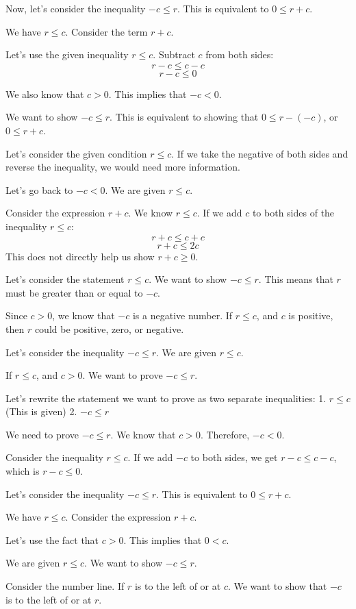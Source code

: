 \documentclass{article}
\begin{document}
Now, let's consider the inequality $-c \le r$.
This is equivalent to $0 \le r + c$.

We have $r \le c$.
Consider the term $r+c$.

Let's use the given inequality $r \le c$.
Subtract $c$ from both sides:
$$ r - c \le c - c $$
$$ r - c \le 0 $$

We also know that $c > 0$. This implies that $-c < 0$.

We want to show $-c \le r$.
This is equivalent to showing that $0 \le r - (-c)$, or $0 \le r + c$.

Let's consider the given condition $r \le c$.
If we take the negative of both sides and reverse the inequality, we would need more information.

Let's go back to $-c < 0$.
We are given $r \le c$.

Consider the expression $r+c$.
We know $r \le c$.
If we add $c$ to both sides of the inequality $r \le c$:
$$ r + c \le c + c $$
$$ r + c \le 2c $$
This does not directly help us show $r+c \ge 0$.

Let's consider the statement $r \le c$.
We want to show $-c \le r$.
This means that $r$ must be greater than or equal to $-c$.

Since $c > 0$, we know that $-c$ is a negative number.
If $r \le c$, and $c$ is positive, then $r$ could be positive, zero, or negative.

Let's consider the inequality $-c \le r$.
We are given $r \le c$.

If $r \le c$, and $c > 0$.
We want to prove $-c \le r$.

Let's rewrite the statement we want to prove as two separate inequalities:
1. $r \le c$ (This is given)
2. $-c \le r$

We need to prove $-c \le r$.
We know that $c > 0$.
Therefore, $-c < 0$.

Consider the inequality $r \le c$.
If we add $-c$ to both sides, we get $r - c \le c - c$, which is $r-c \le 0$.

Let's consider the inequality $-c \le r$.
This is equivalent to $0 \le r + c$.

We have $r \le c$.
Consider the expression $r+c$.

Let's use the fact that $c > 0$.
This implies that $0 < c$.

We are given $r \le c$.
We want to show $-c \le r$.

Consider the number line. If $r$ is to the left of or at $c$.
We want to show that $-c$ is to the left of or at $r$.
\end{document}
